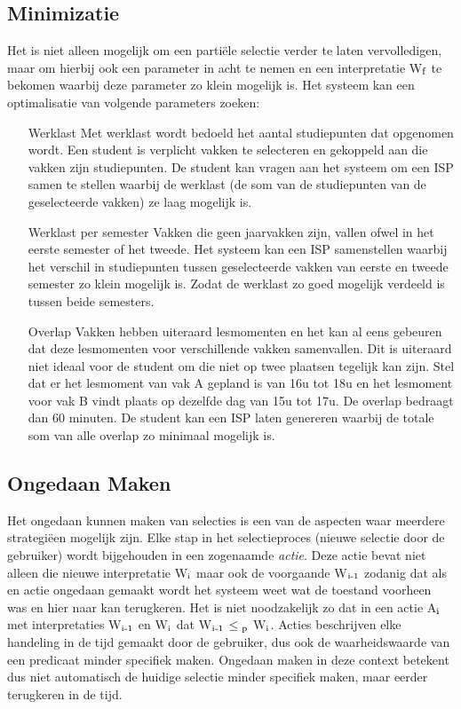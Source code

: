 \subsection{Minimizatie}
Het is niet alleen mogelijk om een parti\"{e}le selectie verder te laten vervolledigen, maar om hierbij ook een parameter in acht te nemen en een interpretatie W$\textsubscript{f}$ te bekomen waarbij deze parameter zo klein mogelijk is. Het systeem kan een optimalisatie van volgende parameters zoeken:
\begin{itemize}
\item[Werklast] Met werklast wordt bedoeld het aantal studiepunten dat opgenomen wordt. Een student is verplicht vakken te selecteren en gekoppeld aan die vakken zijn studiepunten. De student kan vragen aan het systeem om een ISP samen te stellen waarbij de werklast (de som van de studiepunten van de geselecteerde vakken) ze laag mogelijk is.
\item[Werklast per semester] Vakken die geen jaarvakken zijn, vallen ofwel in het eerste semester of het tweede. Het systeem kan een ISP samenstellen waarbij het verschil in studiepunten tussen geselecteerde vakken van eerste en tweede semester zo klein mogelijk is. Zodat de werklast zo goed mogelijk verdeeld is tussen beide semesters.
\item[Overlap] Vakken hebben uiteraard lesmomenten en het kan al eens gebeuren dat deze lesmomenten voor verschillende vakken samenvallen. Dit is uiteraard niet ideaal voor de student om die niet op twee plaatsen tegelijk kan zijn. Stel dat er het lesmoment van vak A gepland is van 16u tot 18u en het lesmoment voor vak B vindt plaats op dezelfde dag van 15u tot 17u. De overlap bedraagt dan 60 minuten. De student kan een ISP laten genereren waarbij de totale som van alle overlap zo minimaal mogelijk is. 
\end{itemize}

\subsection{Ongedaan Maken}
Het ongedaan kunnen maken van selecties is een van de aspecten waar meerdere strategi\"{e}en mogelijk zijn. Elke stap in het selectieproces (nieuwe selectie door de gebruiker) wordt bijgehouden in een zogenaamde \textit{actie}. Deze actie bevat niet alleen die nieuwe interpretatie W$\textsubscript{i}$ maar ook de voorgaande W$\textsubscript{i-1}$ zodanig dat als en actie ongedaan gemaakt wordt het systeem weet wat de toestand voorheen was en hier naar kan terugkeren. Het is niet noodzakelijk zo dat in een actie A$\textsubscript{i}$ met interpretaties W$\textsubscript{i-1}$ en W$\textsubscript{i}$ dat W$\textsubscript{i-1}$ $\leq\textsubscript{p}$ W$\textsubscript{i}$. Acties beschrijven elke handeling in de tijd gemaakt door de gebruiker, dus ook de waarheidswaarde van een predicaat minder specifiek maken. Ongedaan maken in deze context betekent dus niet automatisch de huidige selectie minder specifiek maken, maar eerder terugkeren in de tijd.

